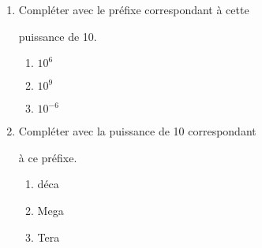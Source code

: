 \begin{exercice*}
    \begin{enumerate}
        \item Compléter avec le préfixe correspondant à cette 
        
        puissance de 10.
        \begin{multicols}{3}
            \begin{enumerate}
                \item $10^{6}$
                \item $10^{9}$
                \item $10^{-6}$
            \end{enumerate}
        \end{multicols}
        \item  Compléter avec la puissance de 10 correspondant 
        
        à ce préfixe.   
        \begin{multicols}{3}
            \begin{enumerate}
                \item déca
                \item Mega
                \item Tera
            \end{enumerate}
        \end{multicols}
    \end{enumerate}

\end{exercice*}
